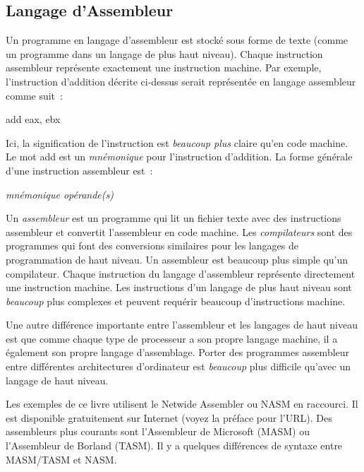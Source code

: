 \subsection{Langage d'Assembleur}

Un programme en langage d'assembleur est stocké sous forme de texte (comme un programme
dans un langage de plus haut niveau). Chaque instruction assembleur représente
exactement une instruction machine. Par exemple, l'instruction d'addition décrite
ci-dessus serait représentée en langage assembleur comme suit~:
\begin{CodeQuote}
   add eax, ebx
\end{CodeQuote}
Ici, la signification de l'instruction est \emph{beaucoup plus} claire qu'en code machine.
Le mot {\code add} est un \emph{mnémonique} pour l'instruction d'addition.
La forme générale d'une instruction assembleur est~:
\begin{CodeQuote}
  {\em mnémonique opérande(s)}
\end{CodeQuote}

Un \emph{assembleur} est un programme qui lit un fichier texte avec des instructions
assembleur et convertit l'assembleur en code machine.
Les \emph{compilateurs} sont des programmes qui font des conversions similaires
pour les langages de programmation de haut niveau. Un assembleur est beaucoup plus simple
qu'un compilateur.  Chaque instruction
du langage d'assembleur représente directement une instruction machine. Les instructions
d'un langage de plus haut niveau sont \emph{beaucoup} plus complexes et peuvent
requérir beaucoup d'instructions machine.

Une autre différence importante entre l'assembleur et les langages de haut niveau est
que comme chaque type de processeur a son propre langage machine, il a également son
propre langage d'assemblage. Porter des programmes assembleur entre différentes
architectures d'ordinateur est \emph{beaucoup} plus difficile qu'avec un langage de
haut niveau.

Les exemples de ce livre utilisent le Netwide Assembler ou NASM en raccourci.
Il est disponible gratuitement sur Internet (voyez la préface pour l'URL). Des
assembleurs plus courants sont l'Assembleur de Microsoft (MASM) ou l'Assembleur
de Borland (TASM). Il y a quelques différences de syntaxe entre MASM/TASM et NASM.

